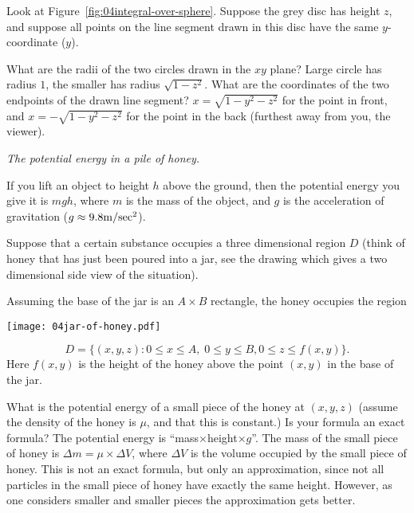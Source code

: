 \problem Look at Figure~\ref{fig:04integral-over-sphere}.  
Suppose the grey disc has height $z$, and suppose all points on the
line segment drawn in this disc have the same $y$-coordinate ($y$).

\subprob What are the radii of the two circles drawn in the 
$xy$ plane?
\answer
Large circle has radius $1$, the smaller has radius $\sqrt{1-z^2}$.
\endanswer
\subprob What are the coordinates of the two endpoints of the drawn 
line segment?
\answer
$x=\sqrt{1-y^2-z^2}$ for the point in front, and $x=-\sqrt{1-y^2-z^2}$
for the point in the back (furthest away from you, the viewer).
\endanswer

\problem \textit{The potential energy in a pile of honey. }\\

\noindent%
\begin{minipage}[b]{0.5\linewidth}
If you lift an object to height $h$ above the ground, then the potential energy you give it is $mgh$, where $m$ is the mass of the object, and $g$ is the acceleration of gravitation ($g\approx 9.8 {\rm m}/{\rm sec}^2$).

Suppose that a certain substance occupies a three dimensional region $D$ (think of honey that has just been poured into a jar, see the drawing which gives a two dimensional side view of the situation).

Assuming the base of the jar is an $A\times B$ rectangle, the honey occupies the region
\end{minipage}\hfill
\begin{minipage}[b]{0.39\linewidth}
\centering
\texttt{[image: 04jar-of-honey.pdf]}

\rule{0pt}{3ex}
\end{minipage}
\[
D = \bigl\{(x,y,z) :
0\leq x\leq A, \; 0\leq y\leq B,
0\leq z\leq f(x, y)\bigr\}.
\]
Here $f(x, y)$ is the height of the honey above the point $(x, y)$ in
the base of the jar.

\subprob What is the potential energy of a small piece 
of the honey at $(x, y, z)$  (assume the density of the honey is
$\mu$, and that this is constant.)  Is your formula an exact
formula?  
\answer
The potential energy is ``mass$\times$height$\times g$''.  The mass of
the small piece of honey is $\Delta m = \mu\times \Delta V$, where
$\Delta V$ is the volume occupied by the small piece of honey.  This
is not an exact formula, but only an approximation, since not all
particles in the small piece of honey have exactly the same height.
However, as one considers smaller and smaller pieces the approximation
gets better.
\endanswer

